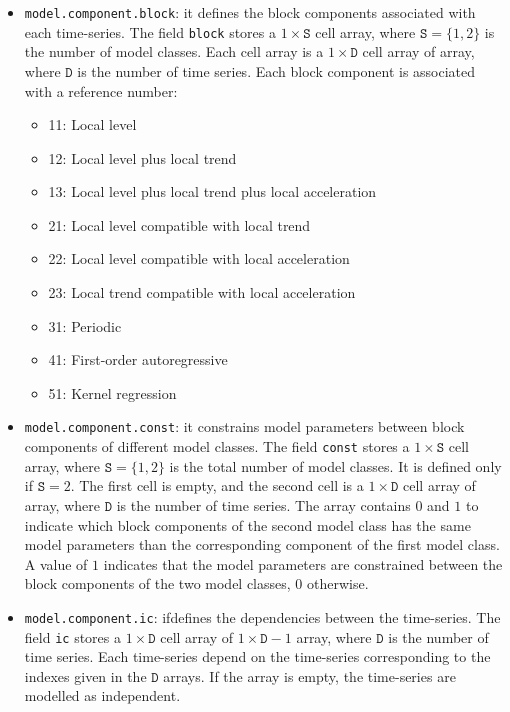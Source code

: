 \begin{itemize}

\item \lstinline[basicstyle = \mlttfamily \small ]!model.component.block!: it defines the block components associated with each time-series.
The field \lstinline[basicstyle = \mlttfamily \small ]!block! stores a $1\times \mathtt{S}$ cell array, where $\mathtt{S} = \{1,2 \}$ is the number of model classes.
Each cell array is a $1\times \mathtt{D}$ cell array of array, where $\mathtt{D}$ is the number of time series.
Each block component is associated with a reference number:
\begin{itemize}
\item 11: Local level 
\item 12: Local level plus local trend
\item 13: Local level plus local trend plus local acceleration
\item 21: Local level compatible with local trend
\item 22: Local level compatible with local acceleration
\item 23: Local trend compatible with local acceleration
\item 31: Periodic
\item 41: First-order autoregressive
\item 51: Kernel regression
\end{itemize}

\item  \lstinline[basicstyle = \mlttfamily \small ]!model.component.const!: it constrains model parameters between block components of different model classes.
The field \lstinline[basicstyle = \mlttfamily \small ]!const! stores a $1\times \mathtt{S}$ cell array, where $\mathtt{S} = \{1, 2 \}$ is the total number of model classes.
It is defined only if $\mathtt{S} = 2$.
The first cell is empty, and the second cell is a $1\times \mathtt{D}$ cell array of array, where $\mathtt{D}$ is the number of time series.
The array contains $0$ and $1$ to indicate which block components of the second model class has the same model parameters than the corresponding component of the first model class. 
A value of $1$ indicates that the model parameters are constrained between the block components of the two model classes, $0$ otherwise.

\item  \lstinline[basicstyle = \mlttfamily \small ]!model.component.ic!:  ifdefines the dependencies between the time-series.
The field \lstinline[basicstyle = \mlttfamily \small ]!ic! stores a $1\times \mathtt{D}$ cell array of $1\times \mathtt{D}-1$ array, where $\mathtt{D}$ is the number of time series.
Each time-series depend on the time-series corresponding to the indexes given in the $\mathtt{D}$ arrays.
If the array is empty, the time-series are modelled as independent.

\end{itemize}


